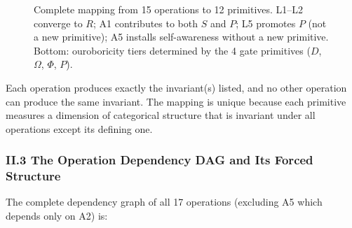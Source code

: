\documentclass[12pt,a4paper]{article}
\begin{document}
\begin{figure}[htbp]
{
}

\caption{Complete mapping from 15 operations to 12 primitives. L1--L2 converge to $R$; A1 contributes to both $S$ and $P$; L5 promotes $P$ (not a new primitive); A5 installs self-awareness without a new primitive. Bottom: ouroboricity tiers determined by the 4 gate primitives ($D$, $\Omega$, $\Phi$, $P$).}
\label{fig:operation-primitive-mapping}
\end{figure}

Each operation produces exactly the invariant(s) listed, and no other operation can produce the same invariant. The mapping is unique because each primitive measures a dimension of categorical structure that is invariant under all operations except its defining one.

\subsubsection{II.3 The Operation Dependency DAG and Its Forced Structure}

The complete dependency graph of all 17 operations (excluding A5 which depends only on A2) is:
\end{document}
